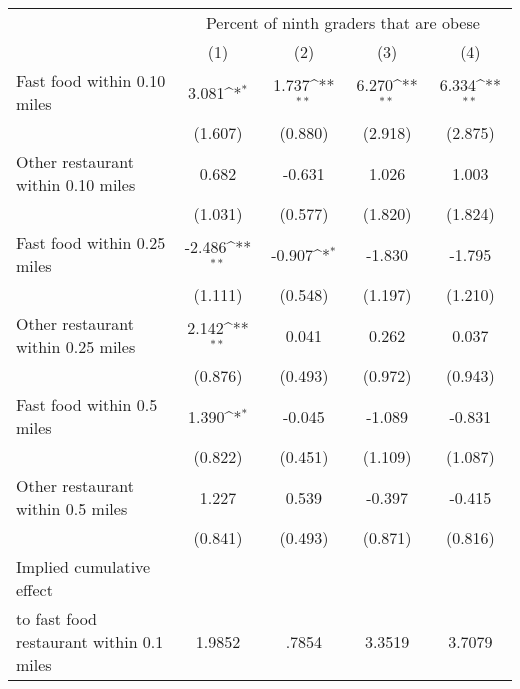 {
\def\sym#1{\ifmmode^{#1}\else\(^{#1}\)\fi}
\begin{tabular}{l*{4}{c}}
\hline\hline
                    &\multicolumn{4}{c}{Percent of ninth graders that are obese }                           \\
                    &\multicolumn{1}{c}{(1)}         &\multicolumn{1}{c}{(2)}         &\multicolumn{1}{c}{(3)}         &\multicolumn{1}{c}{(4)}         \\
\hline
Fast food within 0.10 miles&       3.081\sym{*}  &       1.737\sym{**} &       6.270\sym{**} &       6.334\sym{**} \\
                    &     (1.607)         &     (0.880)         &     (2.918)         &     (2.875)         \\
[1em]
Other restaurant within 0.10 miles&       0.682         &      -0.631         &       1.026         &       1.003         \\
                    &     (1.031)         &     (0.577)         &     (1.820)         &     (1.824)         \\
[1em]
Fast food within 0.25 miles&      -2.486\sym{**} &      -0.907\sym{*}  &      -1.830         &      -1.795         \\
                    &     (1.111)         &     (0.548)         &     (1.197)         &     (1.210)         \\
[1em]
Other restaurant within 0.25 miles&       2.142\sym{**} &       0.041         &       0.262         &       0.037         \\
                    &     (0.876)         &     (0.493)         &     (0.972)         &     (0.943)         \\
[1em]
Fast food within 0.5 miles&       1.390\sym{*}  &      -0.045         &      -1.089         &      -0.831         \\
                    &     (0.822)         &     (0.451)         &     (1.109)         &     (1.087)         \\
[1em]
Other restaurant within 0.5 miles&       1.227         &       0.539         &      -0.397         &      -0.415         \\
                    &     (0.841)         &     (0.493)         &     (0.871)         &     (0.816)         \\
\hline
Implied cumulative effect \\ to fast food restaurant within 0.1 miles&      1.9852         &       .7854         &      3.3519         &      3.7079         \\

\end{tabular}}
